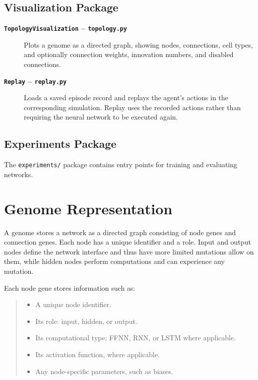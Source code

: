 \documentclass[11pt]{article}
\begin{document}
\subsection{Visualization Package}

\begin{description}

    \item[\textbf{\texttt{TopologyVisualization} -- \texttt{topology.py}}]
    \hspace{1em}Plots a genome as a directed graph, showing nodes,
    connections, cell types, and optionally connection weights,
    innovation numbers, and disabled connections.

    \item[\textbf{\texttt{Replay} -- \texttt{replay.py}}]
    \hspace{1em}Loads a saved episode record and replays the agent's
    actions in the corresponding simulation. Replay uses the recorded
    actions rather than requiring the neural network to be executed again.

\end{description}

\subsection{Experiments Package}

The \texttt{experiments/} package contains entry points for training and
evaluating networks.

\section{Genome Representation}

A genome stores a network as a directed graph consisting of node genes
and connection genes. Each node has a unique identifier and a role.
Input and output nodes define the network interface and thus have more limited mutations allow on them, while hidden nodes perform computations and can experience any mutation.

Each node gene stores information such as:

\begin{quote}
\begin{itemize}
    \item A unique node identifier.
    \item Its role: input, hidden, or output.
    \item Its computational type: FFNN, RNN, or LSTM where applicable.
    \item Its activation function, where applicable.
    \item Any node-specific parameters, such as biases.
\end{itemize}
\end{quote}
\end{document}
